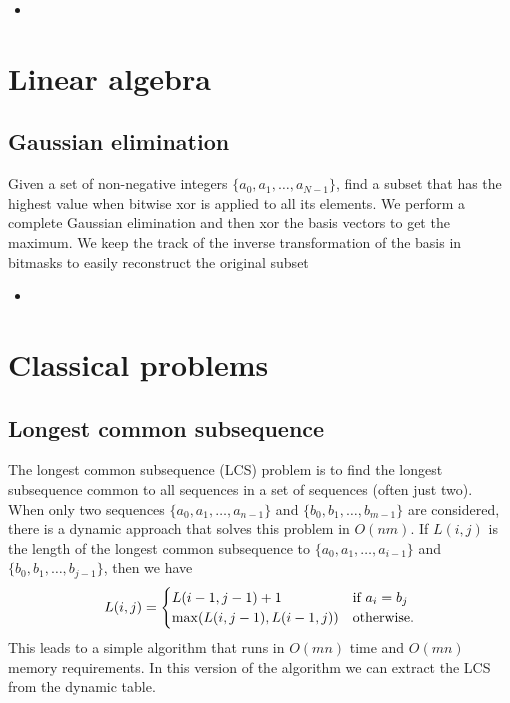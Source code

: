 \documentclass[a4paper, twoside,openany]{book}
\newcounter{problem}\setcounter{problem}{0}
\newcommand{\insertcode}[2]{\begin{itemize}\item[]\end{itemize}} %
\begin{document}
\insertcode{"codes/STL.cpp"}{Introduction to STL}

\chapter{Linear algebra}

\section{Gaussian elimination}
Given a set of non-negative integers $\{ a_0, a_1, \ldots, a_{N-1} \}$, find a subset that has the highest value when bitwise xor is applied to all its elements.
We perform a complete Gaussian elimination and then xor the basis vectors to get the maximum.
We keep the track of the inverse transformation of the basis in bitmasks to easily reconstruct the original subset

\insertcode{"codes/maximal_xor.cpp"}{An algorithm to find a subset of a given set with maximal bitwise xor using Gaussian elimintaion.}



\chapter{Classical problems}
\section{Longest common subsequence}
The longest common subsequence (LCS) problem is to find the longest subsequence common to all sequences in a set of sequences (often just two).
When only two sequences $\{ a_0, a_1, \ldots, a_{n-1}\}$ and $\{ b_0, b_1, \ldots, b_{m-1}\}$ are considered, there is a dynamic approach that solves this problem in $O(nm)$.
If $L(i,j)$ is the length of the longest common subsequence to $\{ a_0, a_1, \ldots, a_{i-1}\}$ and $\{ b_0, b_1, \ldots, b_{j-1}\}$, then we have
\begin{equation}
L(i,j) = \begin{cases} L(i-1,j-1) + 1 &  \textnormal{if } a_i = b_j\\ \max(L(i,j-1), L(i-1,j)) & \textnormal{otherwise.} \end{cases}
\end{equation}
This leads to a simple algorithm that runs in $O(mn)$ time and $O(mn)$ memory requirements. In this version of the algorithm we can extract the LCS from the dynamic table.
\end{document}
